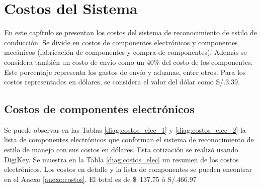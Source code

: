 \chapter{Costos del Sistema}

 \graphicspath{{Chapter6/Figuras/}{Chapter6/Figs/PDF/}{Chapter4/Figs/}}

En este capítulo se presentan los costos del sistema de reconocimiento de estilo de conducción. Se divide en costos de componentes electrónicos y componentes mecánicos (fabricación de componentes y compra de componentes). Además se considera también un costo de envío como un 40\% del costo de los componentes. Este porcentaje representa los gastos de envío y aduanas, entre otros. Para los costos representados en dólares, se considera el valor del dólar como S/.3.39.

\section{Costos de componentes electrónicos}

Se puede observar en las Tablas \ref{diag:costos_elec_1} y \ref{diag:costos_elec_2} la lista de componentes electrónicos que conforman el sistema de reconocimiento de estilo de manejo con sus costos en dólares. Esta cotización se realizó usando DigiKey. Se muestra en la Tabla \ref{diag:costos_elec} un resumen de los costos electrónicos. Los costos en detalle y la lista de componentes se pueden encontrar en el Anexo \ref{anexo:costos}. El total es de \SI{137.75}[\$]{} ó S/.466.97


